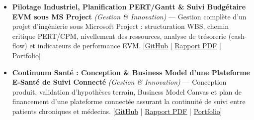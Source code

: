 \documentclass[10pt,a4paper]{article}
\begin{document}
\begin{itemize}
\item \textbf{Pilotage Industriel, Planification PERT/Gantt \& Suivi Budgétaire EVM sous MS Project} \textit{(Gestion \& Innovation)} --- Gestion complète d'un projet d'ingénierie sous Microsoft Project : structuration WBS, chemin critique PERT/CPM, nivellement des ressources, analyse de trésorerie (cash-flow) et indicateurs de performance EVM. [\href{https://github.com/scidelo-andriasahy/industrial-project-management-msproject-pert-gantt}{GitHub} | \href{https://scidelo-andriasahy.github.io/assets/pdfs/Rapport_MSProject_Gestion.pdf}{Rapport PDF} | \href{https://scidelo-andriasahy.github.io/?project=18}{Portfolio}]
\item \textbf{Continuum Santé : Conception \& Business Model d'une Plateforme E-Santé de Suivi Connecté} \textit{(Gestion \& Innovation)} --- Conception produit, validation d'hypothèses terrain, Business Model Canvas et plan de financement d'une plateforme connectée assurant la continuité de suivi entre patients chroniques et médecins. [\href{https://github.com/scidelo-andriasahy/continuum-sante-connected-health-platform}{GitHub} | \href{https://scidelo-andriasahy.github.io/assets/pdfs/Rapport_Continuum_Sante.pdf}{Rapport PDF} | \href{https://scidelo-andriasahy.github.io/?project=19}{Portfolio}]
\end{itemize}
\end{document}

